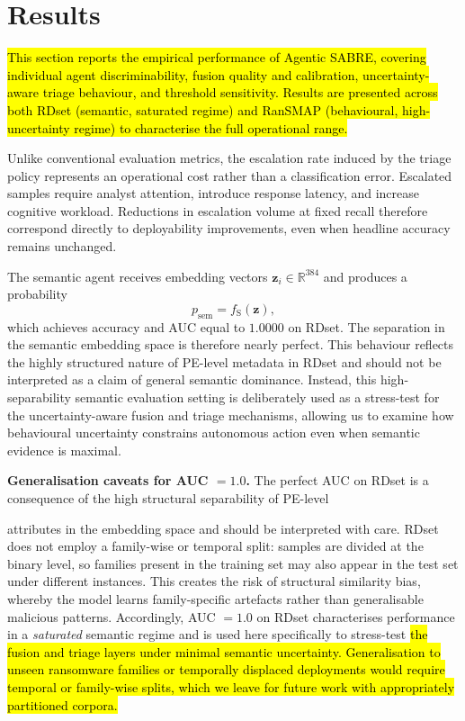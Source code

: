 \documentclass[3p]{elsarticle}
\begin{document}
\section{Results}
\label{sec:results}

\hl{This section reports the empirical performance of Agentic SABRE, covering individual agent
discriminability, fusion quality and calibration, uncertainty-aware triage behaviour, and
threshold sensitivity. Results are presented across both RDset (semantic, saturated regime)
and RanSMAP (behavioural, high-uncertainty regime) to characterise the full operational range.}

Unlike conventional evaluation metrics, the escalation rate induced by the triage policy represents an operational cost rather than a classification error. Escalated samples require analyst attention, introduce response latency, and increase cognitive workload. Reductions in escalation volume at fixed recall therefore correspond directly to deployability improvements, even when headline accuracy remains unchanged.

The semantic agent receives embedding vectors \(\mathbf{z}_i \in \mathbb{R}^{384}\) and produces a probability
\begin{equation}
p_{\mathrm{sem}} = f_{\mathrm{S}}(\mathbf{z}),
\label{eq:psem}
\end{equation}
which achieves accuracy and AUC equal to \(1.0000\) on RDset. The separation in the semantic embedding space is therefore nearly perfect. This behaviour reflects the highly structured nature of PE-level metadata in RDset and should not be interpreted as a claim of general semantic dominance. Instead, this high-separability semantic evaluation setting is deliberately used as a stress-test for the uncertainty-aware fusion and triage mechanisms, allowing us to examine how behavioural uncertainty constrains autonomous action even when semantic evidence is maximal.

\begin{changedblock}
\noindent\textbf{Generalisation caveats for AUC $= 1.0$.}
The perfect AUC on RDset is a consequence of the high structural separability of PE-level
\end{changedblock}
attributes in the embedding space and should be interpreted with care. RDset does not employ
a family-wise or temporal split: samples are divided at the binary level, so families present
in the training set may also appear in the test set under different instances. This creates
the risk of structural similarity bias, whereby the model learns family-specific artefacts
rather than generalisable malicious patterns. Accordingly, AUC $= 1.0$ on RDset characterises
performance in a \emph{saturated} semantic regime and is used here specifically to stress-test
\hl{the fusion and triage layers under minimal semantic uncertainty. Generalisation to unseen
ransomware families or temporally displaced deployments would require temporal or family-wise
splits, which we leave for future work with appropriately partitioned corpora.}
\end{document}
